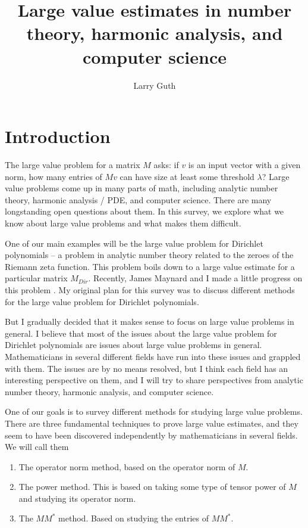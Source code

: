 \documentclass{amsart}
\title{Large value estimates in number theory, harmonic analysis, and computer science}
\author{Larry Guth}
\begin{document}
\maketitle

\section{Introduction}

 The large value problem for a matrix $M$ asks: if $v$ is an input vector with a given norm,  how many entries of $Mv$ can have size at least some threshold $\lambda$?  Large value problems come up in many parts of math, including analytic number theory, harmonic analysis / PDE, and computer science.   There are many longstanding open questions about them.   In this survey,  we explore what we know about large value problems and what makes them difficult.
 
One of our main examples will be the large value problem for Dirichlet polynomials -- a problem in analytic number theory related to the zeroes of the Riemann zeta function.   This problem boils down to a large value estimate for a particular matrix $M_{Dir}$.   Recently,  James Maynard and I made a little progress on this problem \cite{GM}.   My original plan for this survey was to discuss different methods for the large value problem for Dirichlet polynomials.   

But I gradually decided that it makes sense to focus on large value problems in general.   I believe that most of the issues about the large value problem for Dirichlet polynomials are issues about large value problems in general.   Mathematicians in several different fields have run into these issues and grappled with them.   The issues are by no means resolved,  but I think each field has an interesting perspective on them,  and I will try to share perspectives from analytic number theory,  harmonic analysis, and computer science. 

One of our goals is to survey different methods for studying large value problems.    There are three fundamental techniques to prove large value estimates, and they seem to have been discovered independently by mathematicians in several fields.   We will call them 

\begin{enumerate}

\item  The operator norm method, based on the operator norm of $M$.  

\item The power method.  This is based on taking some type of tensor power of $M$ and studying its operator norm.  

\item The $M M^*$ method.  Based on studying the entries of $M M^*$. 

\end{enumerate}
\end{document}
